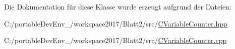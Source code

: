 Die Dokumentation für diese Klasse wurde erzeugt aufgrund der Dateien\+:\begin{DoxyCompactItemize}
\item 
C\+:/portable\+Dev\+Env\+\_/workspace2017/\+Blatt2/src/\hyperlink{_c_variable_counter_8hpp}{C\+Variable\+Counter.\+hpp}\item 
C\+:/portable\+Dev\+Env\+\_/workspace2017/\+Blatt2/src/\hyperlink{_c_variable_counter_8cpp}{C\+Variable\+Counter.\+cpp}\end{DoxyCompactItemize}
